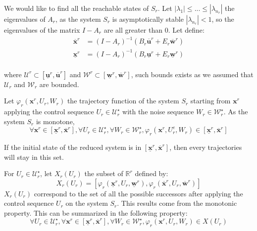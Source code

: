 We would like to find all the reachable states of $S_r$.
Let $|\lambda_1| \leq ... \leq |\lambda_{n_r}|$ the eigenvalues of $A_r$, as the system $S_r$ is asymptotically stable $|\lambda_{n_r}|<1$,
so the eigenvalues of the matrix $I-A_r$ are all greater than 0.
Let define:
\begin{equation}
\begin{split}
\overline{\mathbf{x}}^r &= (I-A_r)^{-1} (B_r \overline{\mathbf{u}}^r + E_r \overline{\mathbf{w}}^r)\\
\underline{\mathbf{x}}^r &= (I-A_r)^{-1} (B_r \underline{\mathbf{u}}^r + E_r \underline{\mathbf{w}}^r)\\
\end{split}
\end{equation}

where $\mathcal{U}^r \subset \left [\underline{\mathbf{u}}^r, \overline{\mathbf{u}}^r \right ]$ and $\mathcal{W}^r \subset \left [\underline{\mathbf{w}}^r, \overline{\mathbf{w}}^r \right ]$, such bounds exists as we assumed that $\mathcal{U}_r$ and $\mathcal{W}_r$ are bounded.

Let $\varphi_r (\mathbf{x}^r,U_r,W_r)$ the trajectory function of the system $S_r$ starting from $\mathbf{x}^r$
applying the control sequence $U_r \in \mathcal{U}_r^\star$
with the noise sequence $W_r \in \mathcal{W}_r^\star$.
As the system $S_r$ is monotone,
$$
\forall \mathbf{x}^r \in \left [\underline{\mathbf{x}}^r, \overline{\mathbf{x}}^r \right ],
\forall U_r \in \mathcal{U}_r^\star,
\forall W_r \in \mathcal{W}_r^\star,
\varphi_r(\mathbf{x}^r,U_r^e,W_r)
\in \left [\underline{\mathbf{x}}^r, \overline{\mathbf{x}}^r \right ]$$

If the initial state of the reduced system is in $\left [\underline{\mathbf{x}}^r, \overline{\mathbf{x}}^r \right ]$, then every trajectories will stay in this set.

For $U_r \in \mathcal{U}_r^\star$, let $X_r(U_r)$ the subset of $\mathbb{R}^r$ defined by:
\begin{equation}
X_r(U_r) = \left [ 
\varphi_r(\underline{\mathbf{x}}^r,U_r,\underline{\mathbf{w}}^r),
\varphi_r(\overline{\mathbf{x}}^r,U_r,\overline{\mathbf{w}}^r)
\right ]
\end{equation}
$X_r(U_r)$ correspond to the set of all the possible successors after applying the control sequence $U_r$ on the system $S_r$. This results come from the monotonic property.
This can be summarized in the following property:
$$
\forall U_r \in \mathcal{U}_r^\star,
\forall \mathbf{x}^r \in \left [\underline{\mathbf{x}}^r, \overline{\mathbf{x}}^r \right ],
\forall W_r \in \mathcal{W}_r^\star,
\varphi_r(\mathbf{x}^r,U_r,W_r)
\in X(U_r)$$

